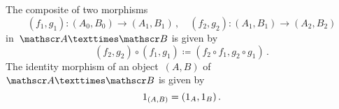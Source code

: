 \subsection{}

The composite of two morphisms
\[
	(f_1, g_1) \colon (A_0, B_0) \to (A_1, B_1) \,,
	\quad
	(f_2, g_2) \colon (A_1, B_1) \to (A_2, B_2)
\]
in~$\Acat × \Bcat$ is given by
\[
	(f_2, g_2) ∘ (f_1, g_1)
	≔
	(f_2 ∘ f_1, g_2 ∘ g_1) \,.
\]
The identity morphism of an object~$(A, B)$ of~$\Acat × \Bcat$ is given by
\[
	1_{(A, B)}
	=
	(1_A, 1_B) \,.
\]
